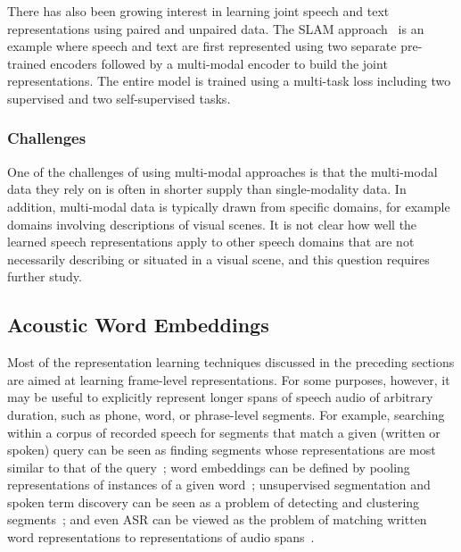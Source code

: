 There has also been growing interest in learning joint speech and text representations using paired and unpaired data. The SLAM approach~\cite{bapna2021slam} is an example where speech and text are first represented using two separate pre-trained encoders followed by a multi-modal encoder to build the joint representations. The entire model is trained using a multi-task loss including two supervised and two self-supervised tasks. 
    


\subsubsection{Challenges}
One of the challenges of using multi-modal approaches is that the multi-modal data they rely on is often in shorter supply than single-modality data. In addition, multi-modal data is typically drawn from specific domains, for example domains involving descriptions of visual scenes. It is not clear how well the learned speech representations apply to other speech domains that are not necessarily describing or situated in a visual scene, and this question requires further study.

\subsection{Acoustic Word Embeddings}


Most of the representation learning techniques discussed in the preceding sections are aimed at learning frame-level representations. For some purposes, however, it may be useful to explicitly represent longer spans of speech audio of arbitrary duration, such as phone, word, or phrase-level segments.  For example, searching within a corpus of recorded speech for segments that match a given (written or spoken) query can be seen as finding segments whose representations are most similar to that of the query~\cite{levin+etal_icassp15,guoguo+etal_icassp15,Chung2016AudioWord2Vec,settle2017query}; word embeddings can be defined by pooling representations of instances of a given word~\cite{chung2018speech2vec}; unsupervised segmentation and spoken term discovery can be seen as a problem of detecting and clustering segments~\cite{kamper2017embedded,Kamper17BESGMM}; and even ASR can be viewed as the problem of matching written word representations to representations of audio spans~\cite{maas+etal_icmlwrl12,bengio+heigold_interspeech14,settle2019_a2w}.  

